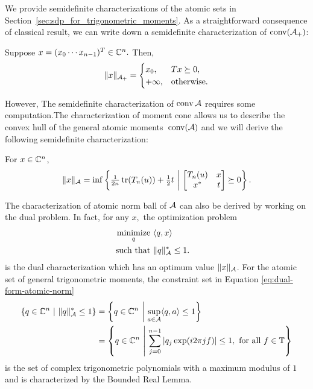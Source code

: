 We provide semidefinite characterizations of the atomic sets in Section~\ref{sec:sdp_for_trigonometric_moments}. As a straightforward consequence of classical result, we can write down a semidefinite
characterization of $\operatorname{conv}(\mathcal{A}_+)$:
\begin{theorem}
\label{thm:positive-linespect-sdp}
Suppose $x = (x_0 \cdots x_{n-1})^T \in \mathbb{C}^n.$ Then, 
	\[
		\lVert x\rVert_{\mathcal{A}_{+}} = \begin{cases}
			x_0, & T x \succeq 0,\\
			+\infty, & \text{otherwise.}
		\end{cases}
	\]
\end{theorem}

However, The semidefinite characterization of $\operatorname{conv}{\mathcal{A}}$ requires some
computation.The characterization of moment cone allows us to describe the convex
hull of the general atomic moments~$\operatorname{conv}(\mathcal{A})$ and we will derive the following
semidefinite characterization:

\begin{theorem}\label{thm:sdp-char}
	For $x\in \mathbb{C}^n$,
	\begin{equation}
	\label{eq:atomic_sdp}
	\|x\|_{\mathcal{A}} = \inf\left\{ \tfrac{1}{2n} \operatorname{tr}( T_n(u)) +\tfrac{1}{2} t ~\middle|~ \begin{bmatrix}
T_n(u) & x\\
x^* & t
\end{bmatrix} \succeq 0 \right\}.
	\end{equation}
\end{theorem}

The characterization of atomic norm ball of $\mathcal{A}$ can also be derived by working on the dual problem. In fact, for any $x,$ the optimization problem
\begin{equation}
	\label{eq:dual-form-atomic-norm}
	\begin{aligned}
		\mathop{\operatorname{minimize}}_q~ & \langle q, x\rangle &&\\
		\text{such that } & \lVert q\rVert_{\mathcal{A}}^*	 \leq 1.	&&
	\end{aligned}
\end{equation}
is the dual characterization which has an optimum value $\lVert x\rVert_{\mathcal{A}}$. For the atomic set of general trigonometric moments, the constraint set in Equation \eqref{eq:dual-form-atomic-norm}
\begin{align}
	\left\{ q \in \mathbb{C}^n ~\middle|~ \lVert q\rVert_{\mathcal{A}}^* \leq 1 \right\} &
	= \left\{ q \in \mathbb{C}^n ~\middle|~ \sup_{a \in \mathcal{A}}\langle q, a\rangle \leq 1 \right\} \\
	&= \left\{ q \in \mathbb{C}^n ~\middle|~ \sum_{j=0}^{n-1}{|q_j \exp(i 2\pi j f)|} \leq 1, \text{ for all } f \in \mathbb{T} \right\}
\end{align}
is the set of complex trigonometric polynomials with a maximum modulus of $1$
and is characterized by the Bounded Real Lemma. 

